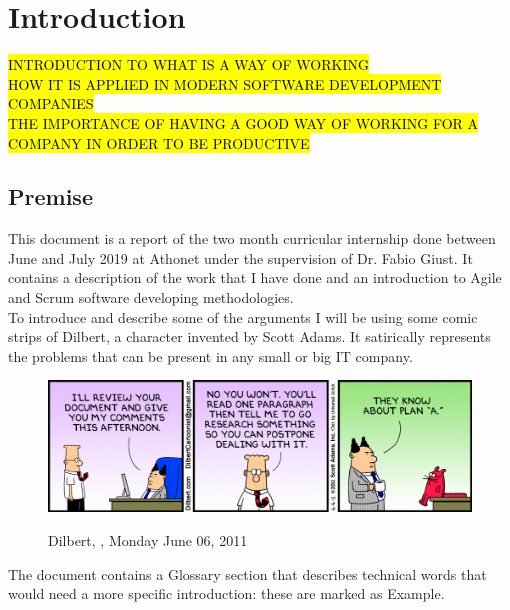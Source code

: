 \chapter{Introduction}
\label{introduction}

%
%
%
%

%

\hl{INTRODUCTION TO WHAT IS A WAY OF WORKING\\HOW IT IS APPLIED IN MODERN SOFTWARE DEVELOPMENT COMPANIES\\THE IMPORTANCE OF HAVING A GOOD WAY OF WORKING FOR A COMPANY IN ORDER TO BE PRODUCTIVE}

\section{Premise}
	This document is a report of the two month curricular internship done between June and July 2019 at Athonet under the supervision of Dr. Fabio Giust.
	It contains a description of the work that I have done and an introduction to Agile and Scrum software developing methodologies.\\
	To introduce and describe some of the arguments I will be using some comic strips of Dilbert, a character invented by Scott Adams\cite{dilbert}.
	It satirically represents the problems that can be present in any small or big IT company.
	\begin{figure}[H]
		\centering
		\includegraphics[width=1\textwidth]{resources/Dissertate}\\
		\caption[Dilbert, ]{Dilbert, , Monday June 06, 2011}
	\end{figure}
	The document contains a Glossary section that describes technical words that would need a more specific introduction: these are marked as \gls{Example}.\\
	
